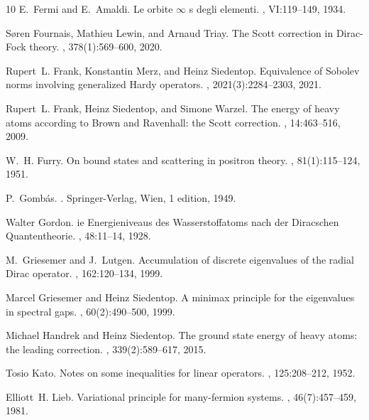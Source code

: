 \documentclass[a4paper]{amsart}
\begin{document}
\begin{thebibliography}{10}
E.~Fermi and E.~Amaldi.
\newblock Le orbite $\infty$ s degli elementi.
, VI:119--149, 1934.

S{\o}ren Fournais, Mathieu Lewin, and Arnaud Triay.
\newblock The {S}cott correction in {D}irac-{F}ock theory.
, 378(1):569--600, 2020.

Rupert~L. Frank, Konstantin Merz, and Heinz Siedentop.
\newblock Equivalence of {S}obolev norms involving generalized {H}ardy
  operators.
, 2021(3):2284--2303, 2021.

Rupert~L. Frank, Heinz Siedentop, and Simone Warzel.
\newblock The energy of heavy atoms according to {B}rown and {R}avenhall: the
  {S}cott correction.
, 14:463--516, 2009.

W.~H. Furry.
\newblock On bound states and scattering in positron theory.
, 81(1):115--124, 1951.

P.~Gomb{\'a}s.
.
\newblock Springer-Verlag, Wien, 1 edition, 1949.

Walter Gordon.
ie {E}nergieniveaus des {W}asserstoffatoms nach der {D}iracschen
  {Q}uantentheorie.
, 48:11--14, 1928.

M.~Griesemer and J.~Lutgen.
\newblock Accumulation of discrete eigenvalues of the radial {D}irac operator.
, 162:120--134, 1999.

Marcel Griesemer and Heinz Siedentop.
\newblock A minimax principle for the eigenvalues in spectral gaps.
, 60(2):490--500, 1999.

Michael Handrek and Heinz Siedentop.
\newblock The ground state energy of heavy atoms: the leading correction.
, 339(2):589--617, 2015.

Tosio Kato.
\newblock Notes on some inequalities for linear operators.
, 125:208--212, 1952.

Elliott~H. Lieb.
\newblock Variational principle for many-fermion systems.
, 46(7):457--459, 1981.


\end{thebibliography}
\end{document}
